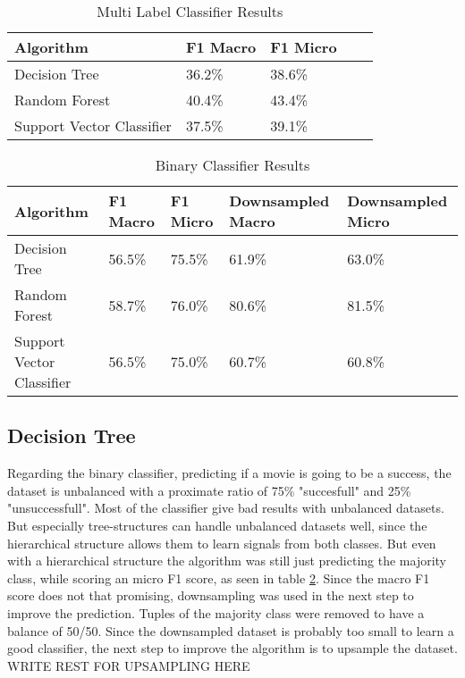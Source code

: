 \begin{center}
\begin{table}
	\begin{tabular}{ | p{3.5cm} | p{1.5cm} | p{1.5cm} | p{2cm} | p{2cm} |}
    \hline
    Algorithm & F1 Macro & F1 Micro \\ \hline
    Decision Tree & 36.2\% & 38.6\%  \\ \hline
    Random Forest & 40.4\% & 43.4\%  \\ \hline
    Support Vector Classifier & 37.5\% & 39.1\% \\
    \hline
    \end{tabular}
    \caption{Multi Label Classifier Results} 
    \label{tab:multi_classifier}
\end{table}
\end{center}

\begin{center}
\begin{table}
	\begin{tabular}{ | p{3.5cm} | p{1.5cm} | p{1.5cm} | p{2cm} | p{2cm} |}
    \hline
    Algorithm & F1 Macro & F1 Micro & Downsampled Macro  & Downsampled Micro\\ \hline
    Decision Tree & 56.5\% & 75.5\% & 61.9\% & 63.0\% \\ \hline
    Random Forest & 58.7\% & 76.0\% & 80.6\% & 81.5\% \\ \hline
    Support Vector Classifier & 56.5\% & 75.0\% & 60.7\% & 60.8\% \\
    \hline
    \end{tabular}
    \caption{Binary Classifier Results} 
    \label{tab:binary_classifier}
\end{table}
\end{center}

\subsection{Decision Tree}
Regarding the binary classifier, predicting if a movie is going to be a success, the dataset is unbalanced with a proximate ratio of 75\% "succesfull" and 25\% "unsuccessfull". Most of the classifier give bad results with unbalanced datasets. But especially tree-structures can handle unbalanced datasets well, since the hierarchical structure allows them to learn signals from both classes.
But even with a hierarchical structure the algorithm was still just predicting the majority class, while scoring an micro F1 score, as seen in table \ref{tab:binary_classifier}. Since the macro F1 score does not that promising, downsampling was used in the next step to improve the prediction.
Tuples of the majority class were removed to have a balance of 50/50.
Since the downsampled dataset is probably too small to learn a good classifier, the next step to improve the algorithm is to upsample the dataset. WRITE REST FOR UPSAMPLING HERE

